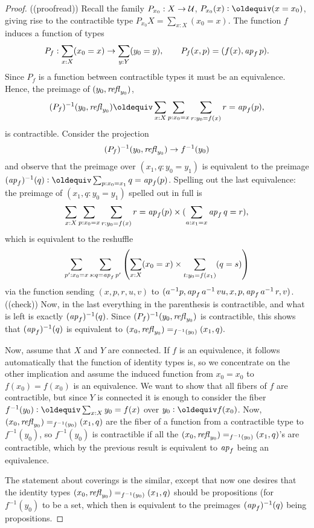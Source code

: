 \begin{proof}
((proofread))
  Recall the family $P_{x_0} : X\to\mathcal{U}$, $P_{x_0}(x)\defequi (x=x_0)$, giving rise to the contractible type $P_{x_0}X=\sum_{x:X}(x_0=x)$.  The function $f$ induces a function of types 
$$P_f:\sum_{x:X}(x_0=x)\to\sum_{y:Y}(y_0=y),\qquad P_f(x,p)=(f(x),\mathop{{\it ap}_{f}} p).$$  Since $P_f$ is a function between contractible types it must be an equivalence.  Hence, the preimage of $(y_0,\mathop{{\it refl}_{y_0}})$, 
$$(P_f)^{-1}(y_0,\refl{y_0})\oldequiv\sum_{x:X}\sum_{p:x_0=x}\sum_{r:y_0=f(x)}r=\ap f(p),$$  
is contractible.  
Consider the projection 
$$(P_f)^{-1}(y_0,\mathop{{\it refl}_{y_0}})\to f^{-1}(y_0)$$ and observe that the preimage over $(x_1,q:y_0=y_1) $ is equivalent to the preimage $(\ap f)^{-1}(q)\defequi\sum_{p:x_0=x_1}q=\ap f(p)$.  Spelling out the last equivalence: the preimage of $(x_1,q:y_0=y_1) $ spelled out in full is
$$\sum_{x:X}\sum_{p:x_0=x}\sum_{r:y_0=f(x)}r=\mathop{{\it ap}_{f}}(p)\times(\sum_{a:x_1=x}\mathop{{\it ap}_{f}} q=r),$$
which is equivalent to the reshuffle
$$\sum_{p':x_0=x}\sum_{s:q=\mathop{{\it ap}_{f}} p'}\left(\sum_{x:X}(x_0=x)\times\sum_{t:y_0=f(x_1)}(q=s)\right)$$
via the function sending $(x,p,r,u,v)$ to $(a^{-1}p,\mathop{{\it ap}_{f}} a^{-1}\,vu,x,p,\mathop{{\it ap}_{f}} a^{-1}\, r,v)$. ((check))  Now, in the last everything in the parenthesis is contractible, and what is left is exactly $(\mathop{{\it ap}_{f}})^{-1}(q)$.  Since $(P_f)^{-1}(y_0,\mathop{{\it refl}_{y_0}})$ is contractible, this shows that $(\mathop{{\it ap}_{f}})^{-1}(q)$ is equivalent to $(x_0,\mathop{{\it refl}_{y_0}})=_{f^{-1}(y_0)}(x_1,q).$

Now, assume that $X$ and $Y$ are connected.   If $f$ is an equivalence, it follows automatically that the function of identity types is, so we concentrate on the other implication and assume the induced function from $x_0=x_0$ to $f(x_0)=f(x_0)$ is an equivalence.  We want to show that all fibers of $f$ are contractible, but since $Y$ is connected it is enough to consider the fiber $f^{-1}(y_0)\defequi\sum_{x:X}y_0=f(x)$ over $y_0\defequi f(x_0)$.  Now, $(x_0,\mathop{{\it refl}_{y_0}})=_{f^{-1}(y_0)}(x_1,q)$ are the fiber of a function from a contractible type to $f^{-1}(y_0)$, so $f^{-1}(y_0)$ is contractible if all the $(x_0,\mathop{{\it refl}_{y_0}})=_{f^{-1}(y_0)}(x_1,q)$'s are contractible, which by the previous result is equivalent to $\mathop{{\it ap}_{f}}$ being an equivalence.  

The statement about coverings is the similar, except that now one desires that the identity types $(x_0,\mathop{{\it refl}_{y_0}})=_{f^{-1}(y_0)}(x_1,q)$ should be propositions (for $f^{-1}(y_0)$ to be a set, which then is equivalent to the preimages $(\mathop{{\it ap}_{f}})^{-1}(q)$ being propositions.
\end{proof}


